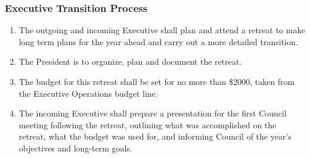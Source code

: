 \subsubsection{Executive Transition Process}
\label{executive-transition-process}
\begin{enumerate}
 \item
  The outgoing and incoming Executive shall plan and attend a retreat to make long term plans for the year ahead and carry out a more detailed transition.
 \item
  The President is to organize, plan and document the retreat.
 \item
  The budget for this retreat shall be set for no more than \$2000, taken from the Executive Operations budget line.
 \item
  The incoming Executive shall prepare a presentation for the first Council meeting following the retreat, outlining what was accomplished on the retreat, what the budget was used for, and informing Council of the year's objectives and long-term goals.
\end{enumerate}

